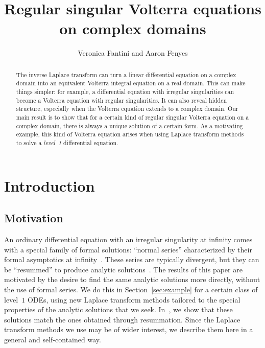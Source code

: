 \documentclass{article}
\title{Regular singular Volterra equations on complex domains}
\author{Veronica Fantini and Aaron Fenyes}
\date{}
\theoremstyle{definition}
\theoremstyle{plain}
\begin{document}
\maketitle

\begin{abstract}
The inverse Laplace transform can turn a linear differential equation on a complex domain into an equivalent Volterra integral equation on a real domain. This can make things simpler: for example, a differential equation with irregular singularities can become a Volterra equation with regular singularities. It can also reveal hidden structure, especially when the Volterra equation extends to a complex domain. Our main result is to show that for a certain kind of regular singular Volterra equation on a complex domain, there is always a unique solution of a certain form. As a motivating example, this kind of Volterra equation arises when using Laplace transform methods to solve a {\em level~1} differential equation.
\end{abstract}
\tableofcontents
\section{Introduction}\label{sec:intro}
\subsection{Motivation}\label{sec:motivation}
An ordinary differential equation with an irregular singularity at infinity comes with a special family of formal solutions: ``normal series'' characterized by their formal asymptotics at infinity~\cite{int-irreg}. These series are typically divergent, but they can be ``resummed'' to produce analytic solutions~\cite{loday1994stokes,diverg-resurg--ii,loday-Remy2011,malgrange1995sommation,ramis1991series}. The results of this paper are motivated by the desire to find the same analytic solutions more directly, without the use of formal series. We do this in Section~\ref{sec:example} for a certain class of level~$1$ ODEs, using new Laplace transform methods tailored to the special properties of the analytic solutions that we seek. In~\cite{borel_reg}, we show that these solutions match the ones obtained through resummation. Since the Laplace transform methods we use may be of wider interest, we describe them here in a general and self-contained way.
\end{document}
